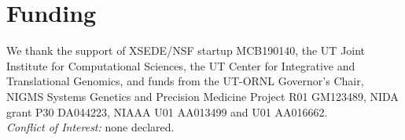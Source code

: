\documentclass{bioinfo}
\begin{document}
\vspace*{-6mm}
\section*{Funding}

We thank the support of XSEDE/NSF startup MCB190140, the UT Joint Institute 
for Computational Sciences, the UT Center for Integrative and Translational 
Genomics, and funds from the UT-ORNL Governor's Chair, NIGMS Systems 
Genetics and Precision Medicine Project R01 GM123489, NIDA grant P30 
DA044223, NIAAA U01 AA013499 and U01 AA016662.\\
\textit{Conflict of Interest:} none declared.

\vspace*{-5mm}


\end{document}

